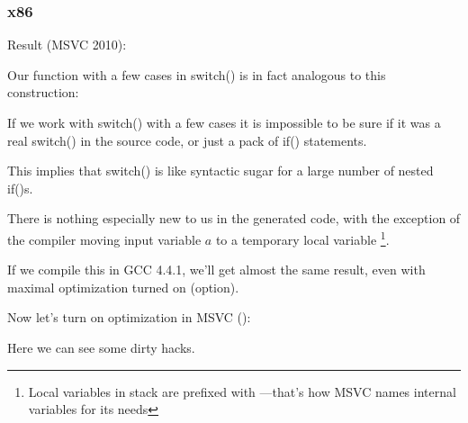 \subsubsection{x86}


Result (MSVC 2010):



Our function with a few cases in switch() is in fact analogous to this construction:




If we work with switch() with a few cases it is impossible to be sure if it was
a real switch() in the source code, or just a pack of if() statements.
\myindex{\SyntacticSugar}

This implies that switch() is like syntactic sugar for a large number of nested if()s.

There is nothing especially new to us in the generated code,
with the exception of the compiler moving input variable $a$ to a temporary local variable 
\footnote{Local variables in stack are prefixed with ---that's how MSVC names internal variables for its needs}.

If we compile this in GCC 4.4.1, we'll get almost the same result, even with maximal optimization
turned on (\Othree option).


Now let's turn on optimization in MSVC (\Ox): 

\label{JMP_instead_of_RET}


Here we can see some dirty hacks.


